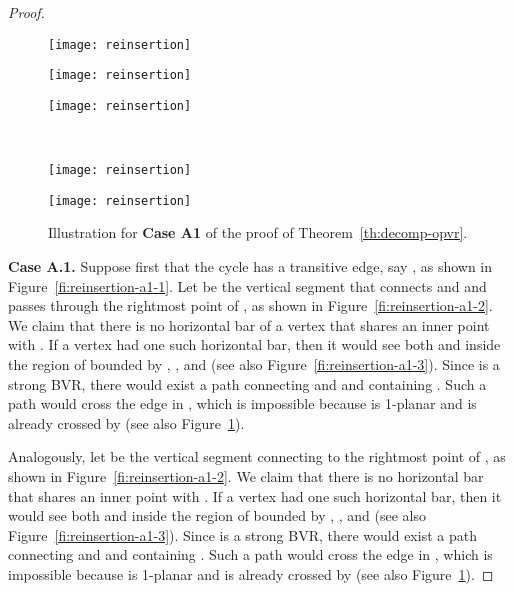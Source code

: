 \documentclass{article}
\begin{document}
\begin{proof}
\begin{figure}[t]
    \centering
    \begin{minipage}[b]{.31\textwidth}
    	\centering
    	\texttt{[image: reinsertion]}
    	\subcaption{}\label{fi:reinsertion-a1-1}
    \end{minipage}
     \begin{minipage}[b]{.31\textwidth}
    	\centering
    	\texttt{[image: reinsertion]}
    	\subcaption{}\label{fi:reinsertion-a1-2}
    \end{minipage}
    \begin{minipage}[b]{.31\textwidth}
    	\centering
    	\texttt{[image: reinsertion]}
    	\subcaption{}\label{fi:reinsertion-a1-5}
    \end{minipage}
    \\
    \begin{minipage}[b]{.31\textwidth}
    	\centering
    	\texttt{[image: reinsertion]}
    	\subcaption{}\label{fi:reinsertion-a1-3}
    \end{minipage}
     \begin{minipage}[b]{.31\textwidth}
    	\centering
    	\texttt{[image: reinsertion]}
    	\subcaption{}\label{fi:reinsertion-a1-4}
    \end{minipage}
    \caption{Illustration for {\bf Case A1} of the proof of Theorem~\ref{th:decomp-opvr}.}
\end{figure}

{\bf Case A.1.} Suppose first that the cycle  has a transitive edge, say , as shown in Figure~\ref{fi:reinsertion-a1-1}. Let  be the vertical segment that connects  and  and passes through the rightmost point of , as shown in Figure~\ref{fi:reinsertion-a1-2}. We claim that there is no horizontal bar of a vertex that shares an inner point with .  If a vertex  had one such horizontal bar, then it would see both  and  inside the region of  bounded by , , and  (see also Figure~\ref{fi:reinsertion-a1-3}). Since  is a strong BVR, there would exist a path connecting  and  and containing . Such a path would cross the edge  in , which is impossible because  is 1-planar and  is already crossed by  (see also Figure~\ref{fi:reinsertion-a1-4}).

Analogously, let  be the vertical segment connecting  to the rightmost point of , as shown in Figure~\ref{fi:reinsertion-a1-2}. We claim that there is no horizontal bar that shares an inner point with . If a vertex  had one such horizontal bar, then it would see both  and  inside the region of  bounded by , , and  (see also Figure~\ref{fi:reinsertion-a1-3}). Since  is a strong BVR, there would exist a path connecting  and  and containing . Such a path would cross the edge  in , which is impossible because  is 1-planar and  is already crossed by  (see also Figure~\ref{fi:reinsertion-a1-4}).


\end{proof}
\end{document}
